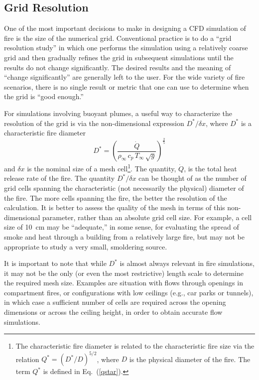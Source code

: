 \documentclass[graybox]{svmult}
\begin{document}
\subsection{Grid Resolution}

One of the most important decisions to make in designing a CFD simulation of fire is the size of the numerical grid. Conventional practice is to do a ``grid resolution study'' in which one performs the simulation using a relatively coarse grid and then gradually refines the grid in subsequent simulations until the results do not change significantly. The desired results and the meaning of ``change significantly'' are generally left to the user. For the wide variety of fire scenarios, there is no single result or metric that one can use to determine when the grid is ``good enough.'' 

For simulations involving buoyant plumes, a useful way to characterize the resolution of the grid is via the non-dimensional expression $D^*/\delta x$, where $D^*$ is a characteristic fire diameter
\begin{equation}
  D^* = \left(\frac{\dot{Q}}{\rho_\infty \, c_p \, T_\infty \, \sqrt{g} } \right)^\frac{2}{5}  \label{Dstar}
\end{equation} 
and $\delta x$ is the nominal size of a mesh cell\footnote{The characteristic fire diameter is related to the characteristic fire size via the relation $Q^* = (D^*/D)^{5/2}$, where $D$ is the physical diameter of the fire. The term $Q^*$ is defined in Eq.~(\ref{qstar}).}. The quantity, $\dot{Q}$, is the total heat release rate of the fire. The quantity $D^*/\delta x$ can be thought of as the number of grid cells spanning the characteristic (not necessarily the physical) diameter of the fire. The more cells spanning the fire, the better the resolution of the calculation. It is better to assess the quality of the mesh in terms of this non-dimensional parameter, rather than an absolute grid cell size. For example, a cell size of 10~cm may be ``adequate,'' in some sense, for evaluating the spread of smoke and heat through a building from a relatively large fire, but may not be appropriate to study a very small, smoldering source.

It is important to note that while $D^*$ is almost always relevant in fire simulations, it may not be the only (or even the most restrictive) length scale to determine the required mesh size. Examples are situation with flows through openings in compartment fires, or configurations with low ceilings (e.g., car parks or tunnels), in which case a sufficient number of cells are required across the opening dimensions or across the ceiling height, in order to obtain accurate flow simulations.  
\end{document}

